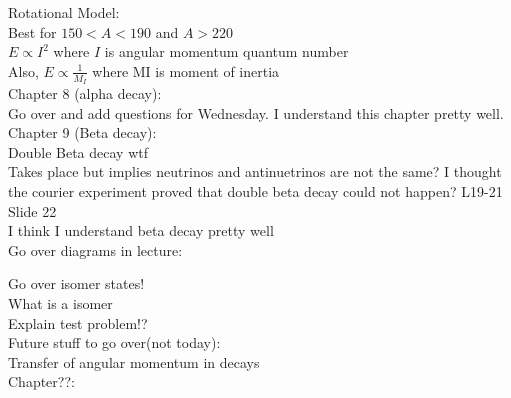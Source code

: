 \documentclass{article}
\begin{document}
\begin{multicols}{3}
Rotational Model:\\
Best for $150<A<190$ and $A>220$\\
$E \propto I^{2}$ where $I$ is angular momentum quantum number\\
Also, $E \propto \frac{1}{M_{I}}$ where MI is moment of inertia\\


Chapter 8 (alpha decay):\\

Go over and add questions for Wednesday.  I understand this chapter pretty well.\\

Chapter 9 (Beta decay):\\

Double Beta decay wtf\\
Takes place but implies neutrinos and antinuetrinos are not the same?  I thought the courier experiment proved that double beta decay could not happen?  L19-21 Slide 22\\

I think I understand beta decay pretty well\\
Go over diagrams in lecture:\\
\hspace*{0.01\textwidth}

Go over isomer states!\\
\hspace*{0.01\textwidth} What is a isomer\\
\hspace*{0.01\textwidth} Explain test problem!?\\

Future stuff to go over(not today):\\
Transfer of angular momentum in decays\\

Chapter??:


\end{multicols}
\end{document}
